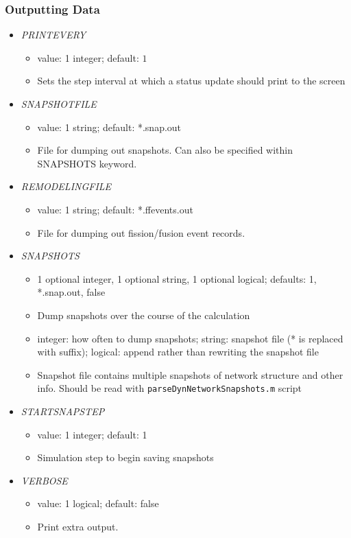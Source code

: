 \documentclass[12pt]{article}
\begin{document}
\subsubsection*{Outputting Data}
\begin{itemize}
%
\item {\it PRINTEVERY}
  \begin{itemize}
    \item  value: 1 integer; default: $1$
    \item Sets the step interval at which a status update should print to the screen
  \end{itemize}
%
\item {\it SNAPSHOTFILE}
  \begin{itemize}
    \item  value: 1 string; default: *.snap.out
    \item File for dumping out snapshots. Can also be specified within SNAPSHOTS keyword.
  \end{itemize}
%
\item {\it REMODELINGFILE}
  \begin{itemize}
    \item  value: 1 string; default: *.ffevents.out
    \item File for dumping out fission/fusion event records.
  \end{itemize}
%
\item {\it SNAPSHOTS}
  \begin{itemize}
    \item 1 optional integer, 1 optional string, 1 optional logical; defaults: 1, *.snap.out, false
    \item Dump snapshots over the course of the calculation
    \item integer: how often to dump snapshots; string: snapshot file (* is replaced with suffix); logical: append rather than rewriting the snapshot file
    \item Snapshot file contains multiple snapshots of network structure and other info. Should be read with \verb=parseDynNetworkSnapshots.m= script
  \end{itemize}
%
\item {\it STARTSNAPSTEP}
  \begin{itemize}
    \item  value: 1 integer; default: 1
    \item Simulation step to begin saving snapshots
  \end{itemize}

\item {\it VERBOSE}
  \begin{itemize}
    \item  value: 1 logical; default: false
    \item Print extra output.
  \end{itemize}
\end{itemize}
\end{document}

